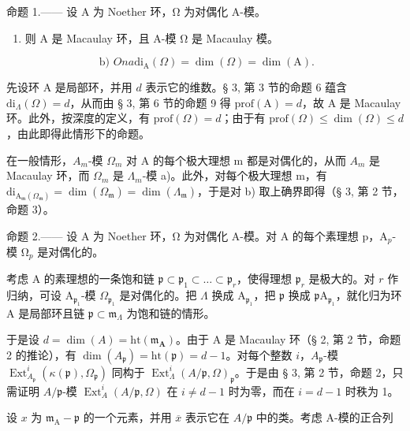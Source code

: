 命题 1.—— 设 A 为 Noether 环，Ω 为对偶化 A-模。

\begin{enumerate}
\def\labelenumi{\alph{enumi})}
\tightlist
\item
  则 A 是 Macaulay 环，且 A-模 Ω 是 Macaulay 模。
\end{enumerate}

\[
\text { b) } O n a \mathrm{di} _ {\mathrm{A}} (\Omega) = \dim (\Omega) = \dim (\mathrm{A}).
\]

先设环 A 是局部环，并用 \(d\) 表示它的维数。§ 3, 第 3 节的命题 6 蕴含 \(\mathrm{di}_{\Lambda}(\Omega) = d\)，从而由 § 3, 第 6 节的命题 9 得 \(\mathrm{prof}(\mathrm{A}) = d\)，故 A 是 Macaulay 环。此外，按深度的定义，有 \(\mathrm{prof}(\Omega) = d\)；由于有 \(\mathrm{prof}(\Omega) \leqslant \dim(\Omega) \leqslant d\)，由此即得此情形下的命题。

在一般情形，\(A_{m}\)-模 \(\Omega_{m}\) 对 A 的每个极大理想 m 都是对偶化的，从而 \(A_{m}\) 是 Macaulay 环，而 \(\Omega_{m}\) 是 \(\Lambda_{m}\)-模 a)。此外，对每个极大理想 m，有 \(\mathrm{di}_{\mathrm{A}_{\mathfrak{m}}(\Omega_{\mathfrak{m}})} = \dim(\Omega_{\mathfrak{m}}) = \dim(\Lambda_{\mathfrak{m}})\)，于是对 b) 取上确界即得（§ 3, 第 2 节，命题 3）。

命题 2.—— 设 A 为 Noether 环，Ω 为对偶化 A-模。对 A 的每个素理想 p，A\(_{p}\)-模 Ω\(_{p}\) 是对偶化的。

考虑 A 的素理想的一条饱和链 \(\mathfrak{p} \subset \mathfrak{p}_1 \subset \ldots \subset \mathfrak{p}_r\)，使得理想 \(\mathfrak{p}_r\) 是极大的。对 \(r\) 作归纳，可设 \(\mathrm{A}_{\mathfrak{p}_1}\)-模 \(\Omega_{\mathfrak{p}_1}\) 是对偶化的。把 \(\Lambda\) 换成 \(\mathrm{A}_{\mathfrak{p}_1}\)，把 \(\mathfrak{p}\) 换成 \(\mathfrak{p}\mathrm{A}_{\mathfrak{p}_1}\)，就化归为环 A 是局部环且链 \(\mathfrak{p} \subset \mathfrak{m}_{\Lambda}\) 为饱和链的情形。

于是设 \(d = \dim(A) = \mathrm{ht}(\mathfrak{m}_{\mathbf{A}})\)。由于 A 是 Macaulay 环（§ 2, 第 2 节，命题 2 的推论），有 \(\dim(A_{\mathfrak{p}}) = \mathrm{ht}(\mathfrak{p}) = d - 1\)。对每个整数 \(i\)，\(A_{\mathfrak{p}}\)-模 \(\operatorname{Ext}_{A_{\mathfrak{p}}}^{i}(\kappa(\mathfrak{p}), \Omega_{\mathfrak{p}})\) 同构于 \(\operatorname{Ext}_{\Lambda}^{i}(A/\mathfrak{p}, \Omega)_{\mathfrak{p}}\)。于是由 § 3, 第 2 节，命题 2，只需证明 \(A/\mathfrak{p}\)-模 \(\operatorname{Ext}_{A}^{i}(A/\mathfrak{p}, \Omega)\) 在 \(i \neq d - 1\) 时为零，而在 \(i = d - 1\) 时秩为 1。

设 \(x\) 为 \(\mathfrak{m}_{\mathrm{A}} - \mathfrak{p}\) 的一个元素，并用 \(\overline{x}\) 表示它在 \(A / \mathfrak{p}\) 中的类。考虑 A-模的正合列

